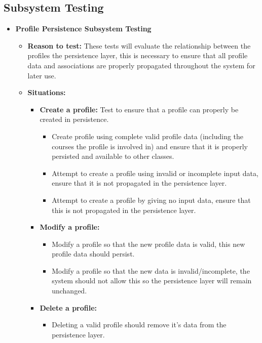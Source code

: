 \documentclass[12pt]{report}
\begin{document}
\subsection{Subsystem Testing}
\begin{itemize}
    \item \textbf{Profile Persistence Subsystem Testing}
         \begin{itemize}
			 \item \textbf{Reason to test:} These tests will evaluate the relationship between the
				 profiles the persistence layer, this is necessary to ensure that all profile data
				 and associations are properly propagated throughout the system for later use.
             \item \textbf{Situations:}
             \begin{itemize}
				 \item \textbf{Create a profile:} Test to ensure that a profile can properly be
					 created in persistence.
                 \begin{itemize}
					 \item Create profile using complete valid profile data (including the courses
						 the profile is involved in) and ensure that it is properly persisted and
						 available to other classes.
					 \item Attempt to create a profile using invalid or incomplete input data,
						 ensure that it is not propagated in the persistence layer.
					 \item Attempt to create a profile by giving no input data, ensure that this is
						 not propagated in the persistence layer.
                 \end{itemize}
                 \item \textbf{Modify a profile:}
                 \begin{itemize}
					 \item Modify a profile so that the new profile data is valid, this new profile
						 data should persist.
					 \item Modify a profile so that the new data is invalid/incomplete, the system
						 should not allow this so the persistence layer will remain unchanged.
                 \end{itemize}
                 \item \textbf{Delete a profile:}
                 \begin{itemize}
                     \item Deleting a valid profile should remove it's data from the persistence layer.

\end{itemize}
\end{itemize}
\end{itemize}
\end{itemize}
\end{document}
